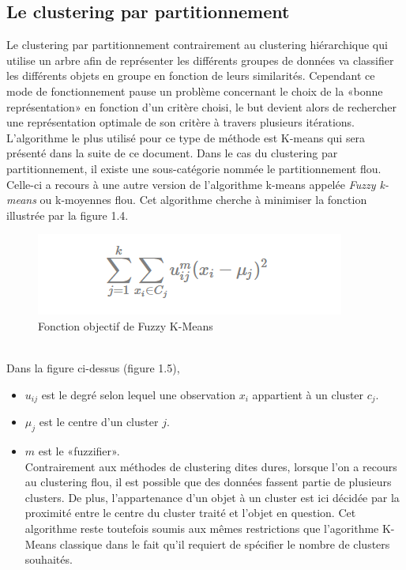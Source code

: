 \documentclass[memoire.tex]{subfiles}
\begin{document}
\newpage
\subsection{Le clustering par partitionnement}
Le clustering par partitionnement contrairement au clustering hiérarchique qui utilise un arbre afin de représenter les différents groupes de données va classifier les différents objets en groupe en fonction de leurs similarités. Cependant ce mode de fonctionnement pause un problème concernant le choix de la «bonne représentation» en fonction d'un critère choisi, le but devient alors de rechercher une représentation optimale de son critère à travers plusieurs itérations.\cite{ref8} L'algorithme le plus utilisé pour ce type de méthode est K-means qui sera présenté dans la suite de ce document. Dans le cas du clustering par partitionnement, il existe une sous-catégorie nommée le partitionnement flou. Celle-ci a recours à une autre version de l'algorithme k-means appelée \textit{Fuzzy k-means} ou k-moyennes flou. Cet algorithme cherche à minimiser la fonction illustrée par la figure 1.4.
	\begin{figure}[h!]
		\centerline{\includegraphics[scale=0.8]{img/fuzzy_algo.png}}
		\caption{Fonction objectif de Fuzzy K-Means}
	\end{figure}\\
Dans la figure ci-dessus (figure 1.5), \begin{itemize}
\item $u_{ij}$ est le degré selon lequel une observation $x_{i}$ appartient à un cluster $c_{j}$.
\item $\mu_j$ est le centre d'un cluster $j$.
\item $m$ est le «fuzzifier».\\
Contrairement aux méthodes de clustering dites dures, lorsque l'on a recours au clustering flou, il est possible que des données fassent partie de plusieurs clusters. De plus, l'appartenance d'un objet à un cluster est ici décidée par la proximité entre le centre du cluster traité et l'objet en question. \cite{ref13} Cet algorithme reste toutefois soumis aux mêmes restrictions que l'agorithme K-Means classique dans le fait qu'il requiert de spécifier le nombre de clusters souhaités.
\end{itemize}
\end{document}
